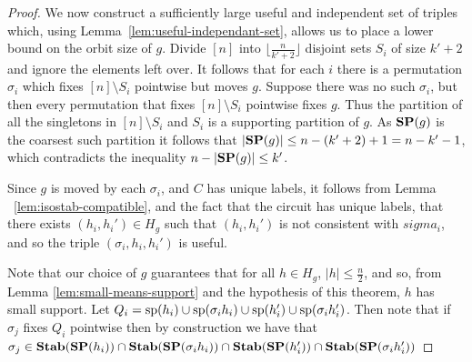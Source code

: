 \documentclass[../paper.tex]{subfiles}
\begin{document}
\begin{proof}
  We now construct a sufficiently large useful and independent set of triples
  which, using Lemma~\ref{lem:useful-independant-set}, allows us to place a
  lower bound on the orbit size of $g$. Divide $[n]$ into $\lfloor \frac{n}{k' +
    2} \rfloor$ disjoint sets $S_i$ of size $k' + 2$ and ignore the elements
  left over. It follows that for each $i$ there is a permutation $\sigma_i$
  which fixes $[n] \setminus S_i$ pointwise but moves $g$. Suppose there was no
  such $\sigma_i$, but then every permutation that fixes $[n]\setminus S_i$
  pointwise fixes $g$. Thus the partition of all the singletons in $[n]\setminus
  S_i$ and $S_i$ is a supporting partition of $g$. As $\text{\textbf{SP}}(g)$ is the coarsest
  such partition it follows that $\vert \text{\textbf{SP}}(g) \vert \leq n - (k'+2) + 1 = n -
  k' - 1$, which contradicts the inequality $n - \vert \text{\textbf{SP}}(g) \vert \leq k'$.

  Since $g$ is moved by each $\sigma_i$, and $C$ has unique labels, it follows
  from Lemma ~\ref{lem:isostab-compatible}, and the fact that the circuit has
  unique labels, that there exists $(h_i, h_i') \in H_g$ such that $(h_i, h_i')$
  is not consistent with $sigma_i$, and so the triple $(\sigma_i, h_i, h_i')$ is
  useful.

  Note that our choice of $g$ guarantees that for all $h \in H_g$, $\vert h
  \vert \leq \frac{n}{2}$, and so, from Lemma \ref{lem:small-means-support} and
  the hypothesis of this theorem, $h$ has small support. Let $Q_i = \text{sp}(h_i)
  \cup \text{sp}(\sigma_i h_i) \cup \text{sp}(h_i') \cup \text{sp}(\sigma_i h_i')$. Then
  note that if $\sigma_j$ fixes $Q_i$ pointwise then by construction we have
  that $\sigma_j \in \text{\textbf{Stab}}(\text{\textbf{SP}}(h_i)) \cap \text{\textbf{Stab}}(\text{\textbf{SP}}(\sigma_i h_i)) \cap
  \text{\textbf{Stab}}(\text{\textbf{SP}}(h_i')) \cap \text{\textbf{Stab}}(\text{\textbf{SP}}(\sigma_i h_i'))$


\end{proof}
\end{document}

